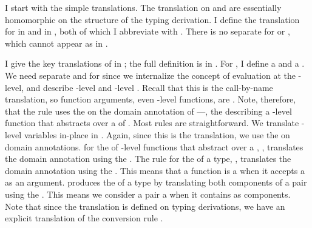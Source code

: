\FigCBNUnv
\FigCBNKind
I start with the simple translations.
The translation on  and  are essentially homomorphic
on the structure of the typing derivation.
I define the translation for  \cbnUname{} in
 and  \cbnKname{} in
, both of which I abbreviate with \im{^+}.
There is no separate  for  or
, which cannot appear as  in \cpsslang.

\FigCBNTypesShort[h!]
I give the key \cbnname{} translations of  in
; the full definition is in
 .
For , I define a  \cbnAname{} and a
 \cbnAdivname{}.
We need separate  and  for  since we internalize the concept of evaluation
at the -level, and  describe -level
 and -level .
Recall that this is the call-by-name translation, so function arguments, even
-level functions, are .
Note, therefore, that the rule  uses the  on the domain annotation \im{\sA} of
\im{\spity{\sx}{\sA}{\sK}}---\ie, the  describing a -level
function that abstracts over a  of  \im{\sA}.
Most rules are straightforward.
We translate -level variables \im{\salpha} in-place in .
Again, since this is the  translation, we use the  on domain annotations.
 for the  of -level
functions that abstract over a , \im{\sfune{\sx}{\sA}{\sB}},
translates the domain annotation \im{\sA} using the .
The rule for the  of a  type,
, translates the domain annotation \im{\sA} using the
.
This means that a function is a  when it accepts a
 as an argument.
 produces the  of a 
type by translating both components of a pair using the .
This means we consider a pair a  when it contains
 as components.
Note that since the translation is defined on typing derivations, we have an
explicit translation of the conversion rule .

